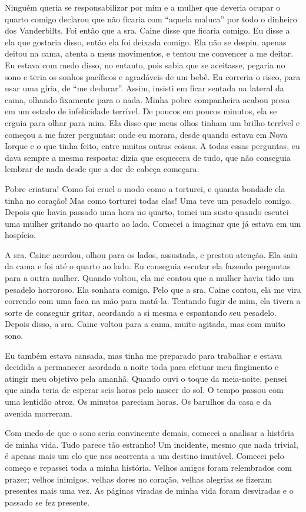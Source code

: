 Ninguém queria se responsabilizar por mim e a mulher que deveria ocupar
o quarto comigo declarou que não ficaria com ``aquela maluca'' por todo
o dinheiro dos Vanderbilts. Foi então que a sra. Caine disse que ficaria
comigo. Eu disse a ela que gostaria disso, então ela foi deixada comigo.
Ela não se despiu, apenas deitou na cama, atenta a meus movimentos, e
tentou me convencer a me deitar. Eu estava com medo disso, no entanto,
pois sabia que se aceitasse, pegaria no sono e teria os sonhos pacíficos
e agradáveis de um bebê. Eu correria o risco, para usar uma gíria, de
``me dedurar''. Assim, insisti em ficar sentada na lateral da cama,
olhando fixamente para o nada. Minha pobre companheira acabou presa em
um estado de infelicidade terrível. De poucos em poucos minutos, ela se
erguia para olhar para mim. Ela disse que meus olhos tinham um brilho
terrível e começou a me fazer perguntas: onde eu morara, desde quando
estava em Nova Iorque e o que tinha feito, entre muitas outras coisas. A
todas essas perguntas, eu dava sempre a mesma resposta: dizia que
esquecera de tudo, que não conseguia lembrar de nada desde que a dor de
cabeça começara.

Pobre criatura! Como foi cruel o modo como a torturei, e quanta bondade
ela tinha no coração! Mas como torturei todas elas! Uma teve um pesadelo
comigo. Depois que havia passado uma hora no quarto, tomei um susto
quando escutei uma mulher gritando no quarto ao lado. Comecei a imaginar
que já estava em um hospício.

A sra. Caine acordou, olhou para os lados, assustada, e prestou atenção.
Ela saiu da cama e foi até o quarto ao lado. Eu conseguia escutar ela
fazendo perguntas para a outra mulher. Quando voltou, ela me contou que
a mulher havia tido um pesadelo horroroso. Ela sonhara comigo. Pelo que
a sra. Caine contou, ela me vira correndo com uma faca na mão para
matá-la. Tentando fugir de mim, ela tivera a sorte de conseguir gritar,
acordando a si mesma e espantando seu pesadelo. Depois disso, a sra.
Caine voltou para a cama, muito agitada, mas com muito sono.

Eu também estava cansada, mas tinha me preparado para trabalhar e estava
decidida a permanecer acordada a noite toda para efetuar meu fingimento
e atingir meu objetivo pela amanhã. Quando ouvi o toque da meia-noite,
pensei que ainda teria de esperar seis horas pelo nascer do sol. O tempo
passou com uma lentidão atroz. Os minutos pareciam horas. Os barulhos da
casa e da avenida morreram.

Com medo de que o sono seria convincente demais, comecei a analisar a
história de minha vida. Tudo parece tão estranho! Um incidente, mesmo
que nada trivial, é apenas mais um elo que nos acorrenta a um destino
imutável. Comecei pelo começo e repassei toda a minha história. Velhos
amigos foram relembrados com prazer; velhos inimigos, velhas dores no
coração, velhas alegrias se fizeram presentes mais uma vez. As páginas
viradas de minha vida foram desviradas e o passado se fez presente.

